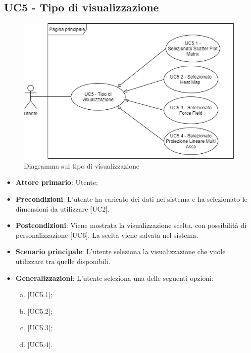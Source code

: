 \subsection{UC5 - Tipo di visualizzazione}
\begin{figure}[!htb]
\includegraphics[width=\linewidth]{Section/Images/UC5.png}
\centering
\caption{Diagramma sul tipo di visualizzazione}
\end{figure}

\begin{itemize}
	\item \textbf{Attore primario}: Utente;
	\item \textbf{Precondizioni}: L'utente ha caricato dei dati nel sistema e ha selezionato le dimensioni da utilizzare [UC2].
	\item \textbf{Postcondizioni}: Viene mostrata la visualizzazione scelta, con possibilità di personalizzazione [UC6]. La scelta viene salvata nel sistema.
	\item \textbf{Scenario principale}: L'utente seleziona la visualizzazione che vuole utilizzare tra quelle disponibili.
	\item \textbf{Generalizzazioni}: L'utente seleziona una delle seguenti opzioni:
		\begin{enumerate}[(a)]
			\item {} [UC5.1];
			\item {} [UC5.2];
			\item {} [UC5.3];
			\item {} [UC5.4].
		\end{enumerate}

\end{itemize}